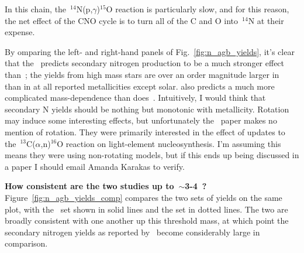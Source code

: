\documentclass[\main/notes.tex]{subfiles}
\begin{document}
\twolineskip 
In this chain, the~$^{14}$N(p,$\gamma$)$^{15}$O reaction is particularly slow, 
and for this reason, the net effect of the CNO cycle is to turn all of the C 
and O into~$^{14}$N at their expense. 
\par 
By omparing the left- and right-hand panels of Fig.~\ref{fig:n_agb_yields}, 
it's clear that the~\citet{Karakas2010} predicts secondary nitrogen production 
to be a much stronger effect than~\citet{Cristallo2011}; the yields from high 
mass stars are over an order magnitude larger in~\citet{Karakas2010} than in 
\citet{Cristallo2011} at all reported metallicities except solar. 
\citet{Karakas2010} also predicts a much more complicated mass-dependence than 
does~\citet{Cristallo2011}. {\color{red} Intuitively, I would think that 
secondary N yields should be nothing but monotonic with metallicity. Rotation 
may induce some interesting effects, but unfortunately the~\citet{Karakas2010} 
paper makes no mention of rotation. They were primarily interested in the 
effect of updates to the~$^{13}$C($\alpha$,n)$^{16}$O reaction on light-element 
nucleosynthesis. I'm assuming this means they were using non-rotating models, 
but if this ends up being discussed in a paper I should email Amanda Karakas 
to verify. } 
\par 
\textbf{How consistent are the two studies up to~$\sim$3-4~\msun?} 
Figure~\ref{fig:n_agb_yields_comp} compares the two sets of yields on the same 
plot, with the~\citet{Cristallo2011} set shown in solid lines and the 
\citet{Karakas2010} set in dotted lines. 
The two are broadly consistent with one another up this threshold mass, at 
which point the secondary nitrogen yields as reported by~\citet{Karakas2010} 
become considerably large in comparison. 






\end{document}
